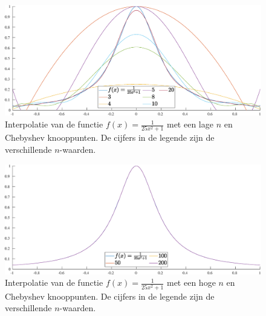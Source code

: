 \documentclass[a4paper, 12pt, titlepage, fleqn]{article}
\begin{document}
\begin{figure}
\centering
\includegraphics[scale=0.4]{../Afbeeldingen/runge_nul_laag.eps}
\caption{Interpolatie van de functie $f(x) = \frac{1}{25x^2+1}$ met een lage $n$ en Chebyshev knooppunten. De cijfers in de legende zijn de verschillende $n$-waarden.}
\label{fig:lageNRungeNul}
\end{figure}

\begin{figure}
\centering
\includegraphics[scale=0.4]{../Afbeeldingen/runge_nul_hoog.eps}
\caption{Interpolatie van de functie $f(x) = \frac{1}{25x^2+1}$ met een hoge $n$ en Chebyshev knooppunten. De cijfers in de legende zijn de verschillende $n$-waarden.}
\label{fig:hogeNRungeNul}
\end{figure}

\newpage
\end{document}
